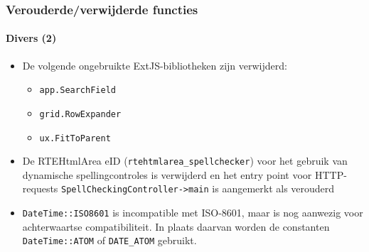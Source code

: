 \begin{frame}[fragile]
	\frametitle{Verouderde/verwijderde functies}
	\framesubtitle{Divers (2)}

	\begin{itemize}

		\item De volgende ongebruikte ExtJS-bibliotheken zijn verwijderd:

			\begin{itemize}
				\item \texttt{app.SearchField}
				\item \texttt{grid.RowExpander}
				\item \texttt{ux.FitToParent}
			\end{itemize}

		\item De RTEHtmlArea eID (\texttt{rtehtmlarea\_spellchecker}) voor het gebruik van 
			dynamische spellingcontroles is verwijderd en het entry point voor HTTP-requests
			\texttt{SpellCheckingController->main} is aangemerkt als verouderd

		\item \texttt{DateTime::ISO8601} is incompatible met ISO-8601,
			maar is nog aanwezig voor achterwaartse compatibiliteit. In plaats daarvan worden
			de constanten \texttt{DateTime::ATOM} of \texttt{DATE\_ATOM} gebruikt.

	\end{itemize}

\end{frame}


